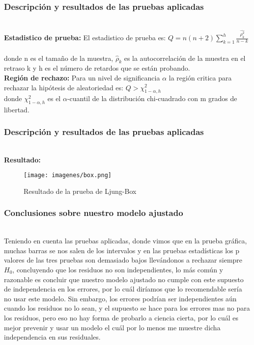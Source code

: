 \documentclass[12pt]{beamer}
\begin{document}
\begin{frame}
\frametitle{Descripción y resultados de las pruebas aplicadas}
~\\ \textbf{Estadistico de prueba:} El estadistico de prueba es: $Q=n(n+2)\sum\limits_{k=1}^{h}\frac{\hat{\rho_{k}^{2}}}{n-k}$
~\\ donde n es el tamaño de la muestra, $\displaystyle {\hat {\rho }}_{k}$  es la autocorrelación de la muestra en el retraso k y h es el número de retardos que se están probando.
~\\ \textbf{Región de rechazo:} Para un nivel de significancia $\alpha$ la región critica para rechazar la hipótesis de aleatoriedad es: $Q>\chi^{2}_{1-\alpha,h}$
~\\donde $\displaystyle \chi _{1-\alpha ,h}^{2}$ es el $\alpha$-cuantil de la distribución chi-cuadrado con m grados de libertad.
\end{frame}

\begin{frame}
\frametitle{Descripción y resultados de las pruebas aplicadas}
~\\ \textbf{Resultado:}\begin{figure}[!h]
    \begin{center}
        \texttt{[image: imagenes/box.png]}
        \caption{Resultado de la prueba de Ljung-Box}
        \label{fig:Densidad}
    \end{center}
\end{figure}
\end{frame}

\begin{frame}
\frametitle{Conclusiones sobre nuestro modelo ajustado}
~\\Teniendo en cuenta las pruebas aplicadas, donde vimos que en la prueba gráfica, muchas barras se nos salen de los intervalos y en las pruebas estadísticas los p valores de las tres pruebas son demasiado bajos llevándonos a rechazar siempre $H_{0}$, concluyendo que los residuos no son independientes, lo más común y razonable es concluir que nuestro modelo ajustado no cumple con este supuesto de independencia en los errores, por lo cuál diríamos que lo recomendable sería no usar este modelo. Sin embargo, los errores podrían ser independientes aún cuando los residuos no lo sean, y el supuesto se hace para los errores mas no para los residuos, pero eso no hay forma de probarlo a ciencia cierta, por lo cuál es mejor prevenir y usar un modelo el cuál por lo menos me muestre dicha independencia en sus residuales.
\end{frame}
\end{document}
